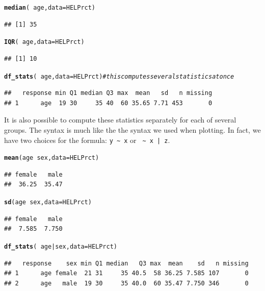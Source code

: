 \documentclass[twoside]{book}\usepackage[]{graphicx}\usepackage[]{xcolor}
\makeatletter
\newcommand{\hlcom}[1]{\textcolor[rgb]{0.678,0.584,0.686}{\textit{#1}}}%
\newcommand{\hlopt}[1]{\textcolor[rgb]{0,0,0}{#1}}%
\newcommand{\hlstd}[1]{\textcolor[rgb]{0.345,0.345,0.345}{#1}}%
\newcommand{\hlkwc}[1]{\textcolor[rgb]{0.333,0.667,0.333}{#1}}%
\newcommand{\hlkwd}[1]{\textcolor[rgb]{0.737,0.353,0.396}{\textbf{#1}}}%
\newenvironment{kframe}{%
 \def\at@end@of@kframe{}%
 \ifinner\ifhmode%
  \def\at@end@of@kframe{\end{minipage}}%
  \begin{minipage}{\columnwidth}%
 \fi\fi%
 \def\FrameCommand##1{\hskip\@totalleftmargin \hskip-\fboxsep
 \colorbox{shadecolor}{##1}\hskip-\fboxsep
     \hskip-\linewidth \hskip-\@totalleftmargin \hskip\columnwidth}%
 \MakeFramed {\advance\hsize-\width
   \@totalleftmargin\z@ \linewidth\hsize
   \@setminipage}}%
 {\par\unskip\endMakeFramed%
 \at@end@of@kframe}
\newenvironment{knitrout}{}{} %
\newcommand{\Rindex}[1]{\index{\texttt{#1}}}
\makeatother
\begin{document}
\Rindex{median()}%
\Rindex{IQR()}%
\Rindex{df_stats()}%
\begin{knitrout}
\color{fgcolor}\begin{kframe}
\begin{alltt}
\hlkwd{median}\hlstd{(} \hlopt{~} \hlstd{age,} \hlkwc{data} \hlstd{= HELPrct)}
\end{alltt}
\begin{verbatim}
## [1] 35
\end{verbatim}
\begin{alltt}
\hlkwd{IQR}\hlstd{(} \hlopt{~} \hlstd{age,} \hlkwc{data} \hlstd{= HELPrct)}
\end{alltt}
\begin{verbatim}
## [1] 10
\end{verbatim}
\begin{alltt}
\hlkwd{df_stats}\hlstd{(} \hlopt{~} \hlstd{age,} \hlkwc{data} \hlstd{= HELPrct)}  \hlcom{# this computes several statistics at once}
\end{alltt}
\begin{verbatim}
##   response min Q1 median Q3 max  mean   sd   n missing
## 1      age  19 30     35 40  60 35.65 7.71 453       0
\end{verbatim}
\end{kframe}
\end{knitrout}

It is also possible to compute these statistics separately for each of several groups.
The syntax is much like the the syntax we used when plotting.  In fact, we have two 
choices for the formula:  \verb!y ~ x! or \verb! ~ x | z!.

\begin{knitrout}
\color{fgcolor}\begin{kframe}
\begin{alltt}
\hlkwd{mean}\hlstd{(age} \hlopt{~} \hlstd{sex,} \hlkwc{data} \hlstd{= HELPrct)}
\end{alltt}
\begin{verbatim}
## female   male 
##  36.25  35.47
\end{verbatim}
\begin{alltt}
\hlkwd{sd}\hlstd{(age} \hlopt{~} \hlstd{sex,} \hlkwc{data} \hlstd{= HELPrct)}
\end{alltt}
\begin{verbatim}
## female   male 
##  7.585  7.750
\end{verbatim}
\begin{alltt}
\hlkwd{df_stats}\hlstd{(} \hlopt{~} \hlstd{age} \hlopt{|} \hlstd{sex,} \hlkwc{data} \hlstd{= HELPrct )}
\end{alltt}
\begin{verbatim}
##   response    sex min Q1 median   Q3 max  mean    sd   n missing
## 1      age female  21 31     35 40.5  58 36.25 7.585 107       0
## 2      age   male  19 30     35 40.0  60 35.47 7.750 346       0
\end{verbatim}
\end{kframe}
\end{knitrout}
\end{document}
